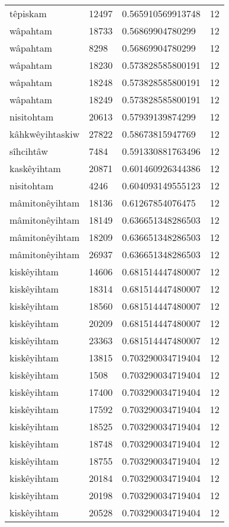 \begin{longtable}{llll}
têpiskam & 12497 & 0.565910569913748 & 12 \\
wâpahtam & 18733 & 0.56869904780299 & 12 \\
wâpahtam & 8298 & 0.56869904780299 & 12 \\
wâpahtam & 18230 & 0.573828585800191 & 12 \\
wâpahtam & 18248 & 0.573828585800191 & 12 \\
wâpahtam & 18249 & 0.573828585800191 & 12 \\
nisitohtam & 20613 & 0.57939139874299 & 12 \\
kâhkwêyihtaskiw & 27822 & 0.58673815947769 & 12 \\
sîhcihtâw & 7484 & 0.591330881763496 & 12 \\
kaskêyihtam & 20871 & 0.601460926344386 & 12 \\
nisitohtam & 4246 & 0.604093149555123 & 12 \\
mâmitonêyihtam & 18136 & 0.61267854076475 & 12 \\
mâmitonêyihtam & 18149 & 0.636651348286503 & 12 \\
mâmitonêyihtam & 18209 & 0.636651348286503 & 12 \\
mâmitonêyihtam & 26937 & 0.636651348286503 & 12 \\
kiskêyihtam & 14606 & 0.681514447480007 & 12 \\
kiskêyihtam & 18314 & 0.681514447480007 & 12 \\
kiskêyihtam & 18560 & 0.681514447480007 & 12 \\
kiskêyihtam & 20209 & 0.681514447480007 & 12 \\
kiskêyihtam & 23363 & 0.681514447480007 & 12 \\
kiskêyihtam & 13815 & 0.703290034719404 & 12 \\
kiskêyihtam & 1508 & 0.703290034719404 & 12 \\
kiskêyihtam & 17400 & 0.703290034719404 & 12 \\
kiskêyihtam & 17592 & 0.703290034719404 & 12 \\
kiskêyihtam & 18525 & 0.703290034719404 & 12 \\
kiskêyihtam & 18748 & 0.703290034719404 & 12 \\
kiskêyihtam & 18755 & 0.703290034719404 & 12 \\
kiskêyihtam & 20184 & 0.703290034719404 & 12 \\
kiskêyihtam & 20198 & 0.703290034719404 & 12 \\
kiskêyihtam & 20528 & 0.703290034719404 & 12 \\

\end{longtable}
